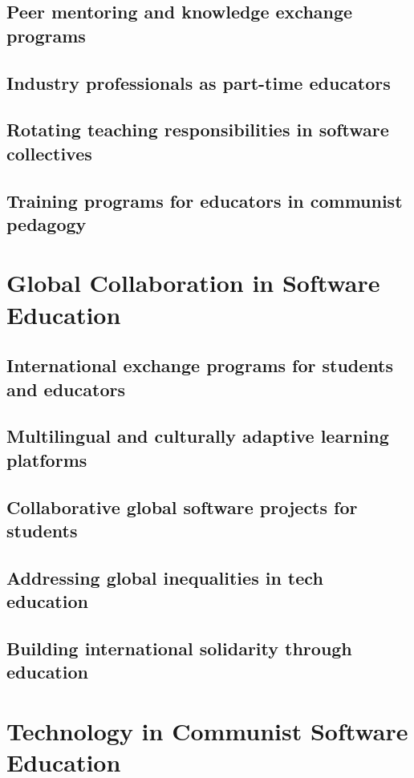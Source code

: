 \subsection{Peer mentoring and knowledge exchange programs}
\subsection{Industry professionals as part-time educators}
\subsection{Rotating teaching responsibilities in software collectives}
\subsection{Training programs for educators in communist pedagogy}

\newpage

\section{Global Collaboration in Software Education}
\subsection{International exchange programs for students and educators}
\subsection{Multilingual and culturally adaptive learning platforms}
\subsection{Collaborative global software projects for students}
\subsection{Addressing global inequalities in tech education}
\subsection{Building international solidarity through education}

\newpage

\section{Technology in Communist Software Education}
